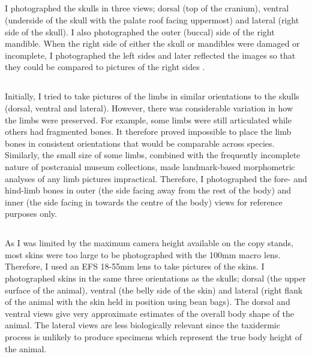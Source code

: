 \subsection{}
I photographed the skulls in three views; dorsal (top of the cranium), ventral (underside of the skull with the palate roof facing uppermost) and lateral (right side of the skull). I also photographed the outer (buccal) side of the right mandible. When the right side of either the skull or mandibles were damaged or incomplete, I photographed the left sides and later reflected the images so that they could be compared to pictures of the right sides \citep[e.g.][]{Barrow2008}.


\subsection{}
Initially, I tried to take pictures of the limbs in similar orientations to the skulls (dorsal, ventral and lateral). However, there was considerable variation in how the limbs were preserved. For example, some limbs were still articulated while others had fragmented bones. It therefore proved impossible to place the limb bones in consistent orientations that would be comparable across species. Similarly, the small size of some limbs, combined with the frequently incomplete nature of postcranial museum collections, made landmark-based morphometric analyses of any limb pictures impractical. Therefore, I photographed the fore- and hind-limb bones in outer (the side facing away from the rest of the body) and inner (the side facing in towards the centre of the body) views for reference purposes only.

\subsection{}
As I was limited by the maximum camera height available on the copy stands, most skins were too large to be photographed with the 100mm macro lens. Therefore, I used an EFS 18-55mm lens to take pictures of the skins. I photographed skins in the same three orientations as the skulls; dorsal (the upper surface of the animal), ventral (the belly side of the skin) and lateral (right flank of the animal with the skin held in position using bean bags). The dorsal and ventral views give very approximate estimates of the overall body shape of the animal. The lateral views are less biologically relevant since the taxidermic process is unlikely to produce specimens which represent the true body height of the animal.

